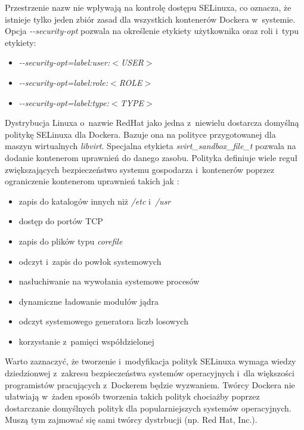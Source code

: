 Przestrzenie nazw nie wpływają na kontrolę dostępu SELinuxa, co oznacza, że istnieje tylko jeden zbiór zasad dla wszystkich kontenerów Dockera w~systemie. Opcja \textit{-{}-security-opt} pozwala na określenie etykiety użytkownika oraz roli i~typu etykiety:

\begin{itemize}
    \item \textit{-{}-security-opt=label:user:$<$USER$>$}
    \item \textit{-{}-security-opt=label:role:$<$ROLE$>$}
    \item \textit{-{}-security-opt=label:type:$<$TYPE$>$}
\end{itemize}

Dystrybucja Linuxa o~nazwie RedHat jako jedna z~niewielu dostarcza domyślną politykę SELinuxa dla Dockera. Bazuje ona na polityce przygotowanej dla maszyn wirtualnych \textit{libvirt}. Specjalna etykieta \textit{svirt_sandbox_file_t} pozwala na dodanie kontenerom uprawnień do danego zasobu. Polityka definiuje wiele reguł zwiększających bezpieczeństwo systemu gospodarza i~kontenerów poprzez ograniczenie kontenerom uprawnień takich jak \cite{RedHatContainerSecurityGuide}:

\begin{itemize}
    \item zapis do katalogów innych niż \textit{/etc} i~\textit{/usr}
    \item dostęp do portów TCP
    \item zapis do plików typu \textit{corefile}
    \item odczyt i~zapis do powłok systemowych
    \item nasłuchiwanie na wywołania systemowe procesów
    \item dynamiczne ładowanie modułów jądra
    \item odczyt systemowego generatora liczb losowych
    \item korzystanie z~pamięci współdzielonej
\end{itemize}

Warto zaznaczyć, że tworzenie i~modyfikacja polityk SELinuxa wymaga wiedzy dziedzionwej z~zakresu bezpieczeństwa systemów operacyjnych i~dla większości programistów pracujących z~Dockerem będzie wyzwaniem. Twórcy Dockera nie ułatwiają w~żaden sposób tworzenia takich polityk chociażby poprzez dostarczanie domyślnych polityk dla popularniejszych systemów operacyjnych. Muszą tym zajmować się sami twórcy dystrbucji (np. Red Hat, Inc.).

